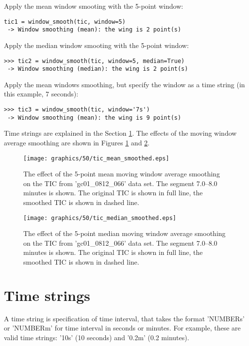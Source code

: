 Apply the mean window smooting with the 5-point window:

\begin{verbatim}
tic1 = window_smooth(tic, window=5)
 -> Window smoothing (mean): the wing is 2 point(s)
\end{verbatim}

Apply the median window smooting with the 5-point window:

\begin{verbatim}
>>> tic2 = window_smooth(tic, window=5, median=True)
 -> Window smoothing (median): the wing is 2 point(s)
\end{verbatim}

Apply the mean windows smoothing, but specify the window as
a time string (in this example, 7 seconds):

\begin{verbatim}
>>> tic3 = window_smooth(tic, window='7s')
 -> Window smoothing (mean): the wing is 9 point(s)
\end{verbatim}

Time strings are explained in the Section \ref{sec:time-string}.
The effects of the moving window average smoothing are shown in
Figures \ref{fig:smoothed-mean} and \ref{fig:smoothed-median}.

\begin{figure}[htp]
\begin{center}
\texttt{[image: graphics/50/tic\_mean\_smoothed.eps]}
\caption{The effect of the 5-point mean moving window average smoothing
on the TIC from 'gc01\_0812\_066' data set. The segment 7.0--8.0
minutes is shown. The original TIC is shown in full line, the smoothed
TIC is shown in dashed line.}
\label{fig:smoothed-mean}
\end{center}
\end{figure}

\begin{figure}[htp]
\begin{center}
\texttt{[image: graphics/50/tic\_median\_smoothed.eps]}
\caption{The effect of the 5-point median moving window average smoothing
on the TIC from 'gc01\_0812\_066' data set. The segment 7.0--8.0
minutes is shown. The original TIC is shown in full line, the smoothed
TIC is shown in dashed line.}
\label{fig:smoothed-median}
\end{center}
\end{figure}

\section{Time strings}
\label{sec:time-string}

A time string is specification of time interval, that takes the format
'NUMBERs' or 'NUMBERm' for time interval in seconds or minutes. For
example, these are valid time strings: '10s' (10 seconds) and '0.2m'
(0.2 minutes).


